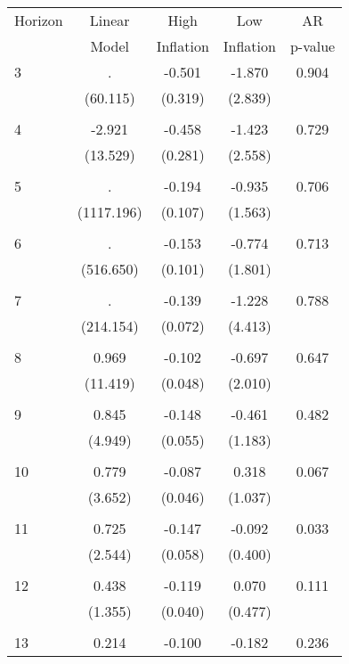 \begin{tabular}{l*{1}{cccc}}
\hline\hline
 Horizon  & Linear & High                 & Low           & AR            \\
                  & Model         & Inflation & Inflation & p-value       \\
\hline
   3       &     . & -0.501 & -1.870 & 0.904 \\
          & (60.115) & (0.319) & (2.839) & \\
 & & & &\\
   4       & -2.921 & -0.458 & -1.423 & 0.729 \\
          & (13.529) & (0.281) & (2.558) & \\
 & & & &\\
   5       &     . & -0.194 & -0.935 & 0.706 \\
          & (1117.196) & (0.107) & (1.563) & \\
 & & & &\\
   6       &     . & -0.153 & -0.774 & 0.713 \\
          & (516.650) & (0.101) & (1.801) & \\
 & & & &\\
   7       &     . & -0.139 & -1.228 & 0.788 \\
          & (214.154) & (0.072) & (4.413) & \\
 & & & &\\
   8       & 0.969 & -0.102 & -0.697 & 0.647 \\
          & (11.419) & (0.048) & (2.010) & \\
 & & & &\\
   9       & 0.845 & -0.148 & -0.461 & 0.482 \\
          & (4.949) & (0.055) & (1.183) & \\
 & & & &\\
  10       & 0.779 & -0.087 & 0.318 & 0.067 \\
          & (3.652) & (0.046) & (1.037) & \\
 & & & &\\
  11       & 0.725 & -0.147 & -0.092 & 0.033 \\
          & (2.544) & (0.058) & (0.400) & \\
 & & & &\\
  12       & 0.438 & -0.119 & 0.070 & 0.111 \\
          & (1.355) & (0.040) & (0.477) & \\
 & & & &\\
  13       & 0.214 & -0.100 & -0.182 & 0.236 \\

\end{tabular}
